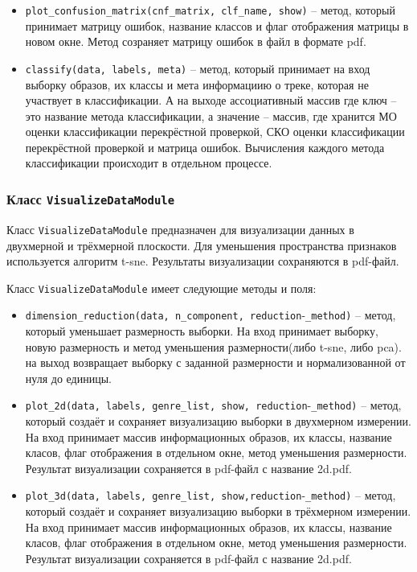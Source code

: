 \begin{itemize}
\item{\texttt{plot\_confusion\_matrix(cnf\_matrix, clf\_name, show)} -- метод, который принимает матрицу ошибок, название классов и флаг отображения матрицы в новом окне.
Метод созраняет матрицу ошибок в файл в формате pdf. }
\item{\texttt{classify(data, labels, meta)} -- метод, который принимает на вход выборку образов, их классы и мета информациию о треке, которая не участвует в классификации. А на выходе ассоциативный массив где ключ -- это название метода классификации, а значение -- массив, где хранится МО оценки классификации перекрёстной проверкой, СКО оценки классификации перекрёстной проверкой и матрица ошибок. Вычисления каждого метода классификации происходит в отдельном процессе.}
\end{itemize}

\subsubsection{Класс \texttt{VisualizeDataModule}}

Класс \texttt{VisualizeDataModule} предназначен для визуализации данных в двухмерной и трёхмерной плоскости. Для уменьшения пространства признаков используется алгоритм t-sne. Результаты визуализации сохраняются в pdf-файл. 

Класс \texttt{VisualizeDataModule} имеет следующие методы и поля:

\begin{itemize}
\item{\texttt{dimension\_reduction(data, n\_component, reduction}-\texttt{\_method)} -- метод, который уменьшает размерность выборки. На вход принимает выборку, новую размерность и метод уменьшения размерности(либо t-sne, либо pca). на выход возвращает выборку с заданной размерности и нормализованной от нуля до единицы.}
\item{\texttt{plot\_2d(data, labels, genre\_list, show, reduction}-\texttt{\_method)} -- метод, который создаёт и сохраняет визуализацию выборки в двухмерном измерении. На вход принимает массив информационных образов, их классы, название класов, флаг отображения в отдельном окне, метод уменьшения размерности. Результат визуализации сохраняется в pdf-файл с название 2d.pdf.}
\item{\texttt{plot\_3d(data, labels, genre\_list, show,reduction}-\texttt{\_method)} -- метод, который создаёт и сохраняет визуализацию выборки в трёхмерном измерении. На вход принимает массив информационных образов, их классы, название класов, флаг отображения в отдельном окне, метод уменьшения размерности. Результат визуализации сохраняется в pdf-файл с название 2d.pdf.}
\end{itemize}

